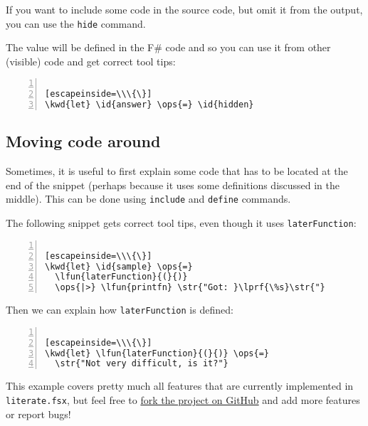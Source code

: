 \documentclass{article}
\newcommand{\id}[1]{\textcolor{black}{#1}}
\newcommand{\kwd}[1]{\textcolor{navy}{#1}}
\newcommand{\ops}[1]{\textcolor{purple}{#1}}
\newcommand{\str}[1]{\textcolor{olive}{#1}}
\begin{document}
If you want to include some code in the source code,
but omit it from the output, you can use the \texttt{hide}
command.


The value will be defined in the F\# code and so you
can use it from other (visible) code and get correct
tool tips:
\begin{lstlisting}[numbers=left]

[escapeinside=\\\{\}]
\kwd{let} \id{answer} \ops{=} \id{hidden}

\end{lstlisting}

\subsection*{Moving code around}



Sometimes, it is useful to first explain some code that
has to be located at the end of the snippet (perhaps
because it uses some definitions discussed in the middle).
This can be done using \texttt{include} and \texttt{define} commands.


The following snippet gets correct tool tips, even though
it uses \texttt{laterFunction}:
\begin{lstlisting}[numbers=left]

[escapeinside=\\\{\}]
\kwd{let} \id{sample} \ops{=} 
  \lfun{laterFunction}{(}{)}
  \ops{|>} \lfun{printfn} \str{"Got: }\lprf{\%s}\str{"}

\end{lstlisting}



Then we can explain how \texttt{laterFunction} is defined:
\begin{lstlisting}[numbers=left]

[escapeinside=\\\{\}]
\kwd{let} \lfun{laterFunction}{(}{)} \ops{=} 
  \str{"Not very difficult, is it?"}

\end{lstlisting}



This example covers pretty much all features that are
currently implemented in \texttt{literate.fsx}, but feel free
to \href{https://github.com/fsprojects/FSharp.Formatting}{fork the project on GitHub} and add more
features or report bugs!
\end{document}
